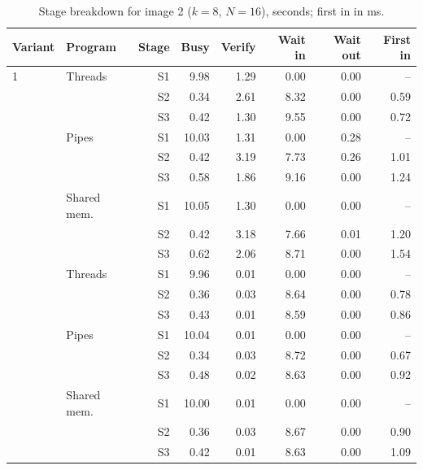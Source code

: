\documentclass[11pt,a4paper]{article}
\newcommand{\cfgK}{8}
\newcommand{\cfgRing}{16}
\begin{document}
\begin{table}[htbp]
\centering
\caption{Stage breakdown for image 2 ($k=\cfgK$, $N=\cfgRing$), seconds; first in in ms.}
\label{tab:stages2}
\begin{tabular}{llrrrrrr}
\toprule
Variant & Program & Stage & Busy & Verify & Wait in & Wait out & First in \\
\midrule
1 & Threads & S1 & 9.98 & 1.29 & 0.00 & 0.00 & -- \\
 &  & S2 & 0.34 & 2.61 & 8.32 & 0.00 & 0.59 \\
 &  & S3 & 0.42 & 1.30 & 9.55 & 0.00 & 0.72 \\
\addlinespace
1 & Pipes & S1 & 10.03 & 1.31 & 0.00 & 0.28 & -- \\
 &  & S2 & 0.42 & 3.19 & 7.73 & 0.26 & 1.01 \\
 &  & S3 & 0.58 & 1.86 & 9.16 & 0.00 & 1.24 \\
\addlinespace
1 & Shared mem. & S1 & 10.05 & 1.30 & 0.00 & 0.00 & -- \\
 &  & S2 & 0.42 & 3.18 & 7.66 & 0.01 & 1.20 \\
 &  & S3 & 0.62 & 2.06 & 8.71 & 0.00 & 1.54 \\
\addlinespace
2 & Threads & S1 & 9.96 & 0.01 & 0.00 & 0.00 & -- \\
 &  & S2 & 0.36 & 0.03 & 8.64 & 0.00 & 0.78 \\
 &  & S3 & 0.43 & 0.01 & 8.59 & 0.00 & 0.86 \\
\addlinespace
2 & Pipes & S1 & 10.04 & 0.01 & 0.00 & 0.00 & -- \\
 &  & S2 & 0.34 & 0.03 & 8.72 & 0.00 & 0.67 \\
 &  & S3 & 0.48 & 0.02 & 8.63 & 0.00 & 0.92 \\
\addlinespace
2 & Shared mem. & S1 & 10.00 & 0.01 & 0.00 & 0.00 & -- \\
 &  & S2 & 0.36 & 0.03 & 8.67 & 0.00 & 0.90 \\
 &  & S3 & 0.42 & 0.01 & 8.63 & 0.00 & 1.09 \\
\bottomrule
\end{tabular}
\end{table}
\end{document}
